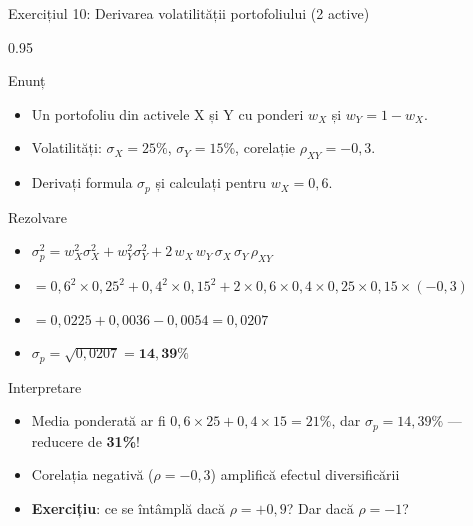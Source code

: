 \documentclass[9pt, aspectratio=169, t]{beamer}
\begin{document}
\begin{frame}[shrink=15]{Exercițiul 10: Derivarea volatilității portofoliului (2 active)}
    \begin{cminipage}{0.95\textwidth}
    \begin{block}{Enunț}
    \begin{itemize}\setlength{\itemsep}{0pt}
        \item Un portofoliu din activele X și Y cu ponderi $w_X$ și $w_Y = 1 - w_X$.
        \item Volatilități: $\sigma_X = 25\%$, $\sigma_Y = 15\%$, corelație $\rho_{XY} = -0{,}3$.
        \item Derivați formula $\sigma_p$ și calculați pentru $w_X = 0{,}6$.
    \end{itemize}
    \end{block}
    \vspace{0.1cm}
    \begin{exampleblock}{Rezolvare}
    \begin{itemize}\setlength{\itemsep}{0pt}
        \item $\sigma_p^2 = w_X^2\sigma_X^2 + w_Y^2\sigma_Y^2 + 2\,w_X\,w_Y\,\sigma_X\,\sigma_Y\,\rho_{XY}$
        \item $= 0{,}6^2 \times 0{,}25^2 + 0{,}4^2 \times 0{,}15^2 + 2 \times 0{,}6 \times 0{,}4 \times 0{,}25 \times 0{,}15 \times (-0{,}3)$
        \item $= 0{,}0225 + 0{,}0036 - 0{,}0054 = 0{,}0207$
        \item $\sigma_p = \sqrt{0{,}0207} = \mathbf{14{,}39\%}$
    \end{itemize}
    \end{exampleblock}
    \begin{alertblock}{Interpretare}
    \begin{itemize}\setlength{\itemsep}{0pt}
        \item Media ponderată ar fi $0{,}6 \times 25 + 0{,}4 \times 15 = 21\%$, dar $\sigma_p = 14{,}39\%$ --- reducere de \textbf{31\%}!
        \item Corelația negativă ($\rho = -0{,}3$) amplifică efectul diversificării
        \item \textbf{Exercițiu}: ce se întâmplă dacă $\rho = +0{,}9$? Dar dacă $\rho = -1$?
    \end{itemize}
    \end{alertblock}
    \end{cminipage}
\end{frame}
\end{document}
